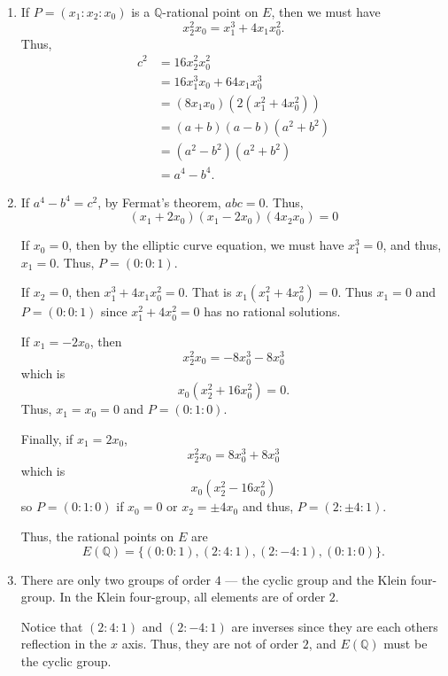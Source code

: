 \documentclass[12 pt, letterpaper]{hmcpset}
\begin{document}
\begin{solution}
	\begin{enumerate}
		\item If $P = (x_{1} : x_{2} : x_{0})$ is a $\mathbb{Q}$-rational point on $E$, then we must have
			 \[
				x_{2}^{2} x_{0} = x_{1}^{3} + 4 x_{1} x_{0}^{2}.
			\]
			Thus,
			\[
				\begin{split}
					c^{2} & = 16 x_{2}^{2} x_{0}^{2} \\
					      & = 16 x_{1}^{3} x_{0} + 64 x_{1} x_{0}^{3} \\
					      & = (8 x_{1} x_{0}) (2 (x_{1}^{2} + 4 x_{0}^{2})) \\
					      & = (a + b)(a - b) (a^{2} + b^{2}) \\
					      & = (a^{2} - b^{2}) (a^{2} + b^{2}) \\
					      & = a^{4} - b^{4}.
				\end{split}
			\]
		\item If $a^{4} - b^{4} = c^{2}$, by Fermat's theorem, $abc = 0$. Thus,
			\[
				(x_{1} + 2 x_{0})(x_{1} - 2x_{0})(4 x_{2} x_{0}) = 0
			\]

			If $x_{0} = 0$, then by the elliptic curve equation, we must have $x_{1}^{3} = 0$, and thus, $x_{1} = 0$. Thus, $P = (0 : 0 : 1)$.

			If $x_{2} = 0$, then $x_{1}^{3} + 4 x_{1} x_{0}^{2} = 0$. That is $x_{1}(x_{1}^{2} + 4 x_{0}^{2}) = 0$. Thus $x_{1} = 0$ and $P = (0 : 0 : 1)$ since $x_{1}^{2} + 4 x_{0}^{2} = 0$ has no rational solutions.

			If $x_{1} = - 2 x_{0}$, then
			\[
				x_{2}^{2} x_{0} = -8 x_{0}^{3} - 8 x_{0}^{3}
			\]
			which is
			\[
				x_{0}(x_{2}^{2} + 16 x_{0}^{2}) = 0.
			\]
			Thus, $x_{1} = x_{0} = 0$ and $P = (0 : 1 : 0)$.

			Finally, if $x_{1} = 2 x_{0}$,
			\[
				x_{2}^{2} x_{0} = 8 x_{0}^{3} + 8 x_{0}^{3}
			\]
			which is
			\[
				x_{0}(x_{2}^{2} - 16 x_{0}^{2})
			\]
			so $P = (0 : 1 : 0)$ if $x_{0} = 0$ or $x_{2} = \pm 4 x_{0}$ and thus, $P = (2 : \pm 4 : 1)$.

			Thus, the rational points on $E$ are
			\[
				E(\mathbb{Q}) = \{ (0 : 0 : 1), (2 : 4 : 1), (2 : -4 : 1), (0 : 1 : 0) \}.
			\]
		\item There are only two groups of order $4$ --- the cyclic group and the Klein four-group. In the Klein four-group, all elements are of order $2$.

			Notice that $(2 : 4 : 1)$ and $(2 : -4 : 1)$ are inverses since they are each others reflection in the $x$ axis. Thus, they are not of order $2$, and $E(\mathbb{Q})$ must be the cyclic group.
	\end{enumerate}
\end{solution}
\end{document}
